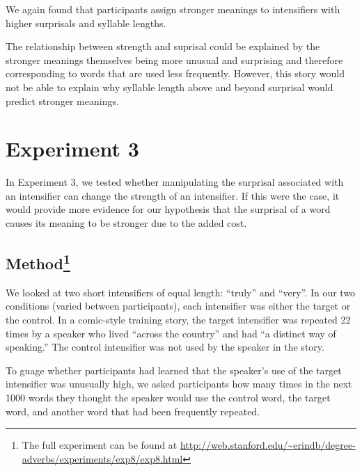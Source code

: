 \documentclass[10pt,letterpaper]{article}
\begin{document}
We again found that participants assign stronger meanings to intensifiers with higher surprisals and syllable lengths.

The relationship between strength and suprisal could be explained by the stronger meanings themselves being more unusual and surprising and therefore corresponding to words that are used less frequently.
However, this story would not be able to explain why syllable length above and beyond surprisal would predict stronger meanings.


\section{Experiment 3}

In Experiment 3, we tested whether manipulating the surprisal associated with an intensifier can change the strength of an intensifier. If this were the case, it would provide more evidence for our hypothesis that the surprisal of a word causes its meaning to be stronger due to the added cost.

\subsection{Method\footnote{The full experiment can be found at \url{http://web.stanford.edu/~erindb/degree-adverbs/experiments/exp8/exp8.html}}}


We looked at two short intensifiers of equal length: ``truly'' and ``very''. In our two conditions (varied between participants), each intensifier was either the target or the control. In a comic-style training story, the target intensifier was repeated 22 times by a speaker who lived ``across the country'' and had ``a distinct way of speaking.'' The control intensifier was not used by the speaker in the story.

To guage whether participants had learned that the speaker's use of the target intensifier was unusually high, we asked participants how many times in the next 1000 words they thought the speaker would use the control word, the target word, and another word that had been frequently repeated.
\end{document}
